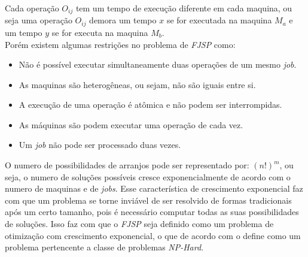 Cada operação $O_{ij}$ tem um tempo de execução diferente em cada maquina, ou seja uma operação 
$O_{ij}$ demora um tempo $x$ se for executada na maquina $M_a$ e um tempo $y$ se for executa na maquina $M_b$.\\
Porém existem algumas restrições no problema de \textit{FJSP} como:
\begin{itemize}
    \item Não é possível executar simultaneamente duas operações de um mesmo \textit{job}.
    \item As maquinas são heterogêneas, ou sejam, não são iguais entre si.
    \item A execução de uma operação é atômica e não podem ser interrompidas.
    \item As máquinas são podem executar uma operação de cada vez.
    \item Um \textit{job} não pode ser processado duas vezes.
\end{itemize}

O numero de possibilidades de arranjos pode ser representado por: $(n!)^m$, ou seja, o numero de soluções possíveis cresce exponencialmente de acordo com o numero de maquinas e de \textit{jobs}.
Esse característica de crescimento exponencial faz com que um problema se torne inviável de ser resolvido de formas tradicionais após um certo tamanho, pois é necessário computar todas as suas possibilidades de soluções.
Isso faz com que o \textit{FJSP} seja definido como um problema de otimização com crescimento exponencial, o que de acordo com \citeauthor{Eswaramurthy2008} o define como um problema pertencente a classe de problemas \textit{NP-Hard}.\hfill

